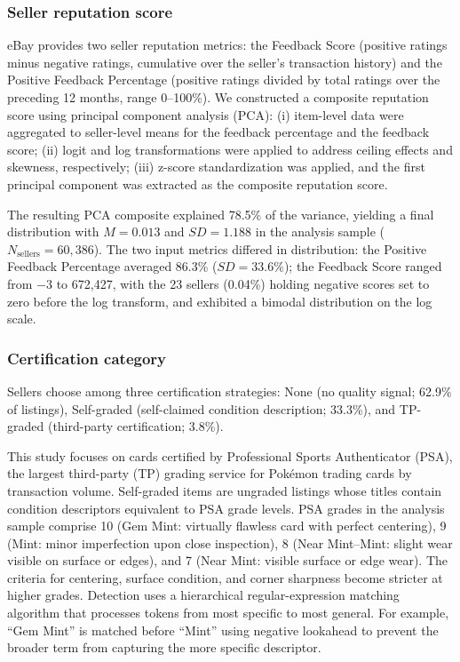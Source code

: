 \documentclass[11pt,letterpaper]{article}
\theoremstyle{definition}
\begin{document}
\subsubsection{Seller reputation score}

eBay provides two seller reputation metrics: the Feedback Score (positive ratings minus negative ratings, cumulative over the seller's transaction history) and the Positive Feedback Percentage (positive ratings divided by total ratings over the preceding 12 months, range 0--100\%). We constructed a composite reputation score using principal component analysis (PCA): (i) item-level data were aggregated to seller-level means for the feedback percentage and the feedback score; (ii) logit and log transformations were applied to address ceiling effects and skewness, respectively; (iii) z-score standardization was applied, and the first principal component was extracted as the composite reputation score.

The resulting PCA composite explained 78.5\% of the variance, yielding a final distribution with $M = 0.013$ and $SD = 1.188$ in the analysis sample ($N_{\text{sellers}} = 60{,}386$). The two input metrics differed in distribution: the Positive Feedback Percentage averaged 86.3\% ($SD = 33.6\%$); the Feedback Score ranged from $-3$ to 672,427, with the 23 sellers (0.04\%) holding negative scores set to zero before the log transform, and exhibited a bimodal distribution on the log scale.

\subsubsection{Certification category}

Sellers choose among three certification strategies: None (no quality signal; 62.9\% of listings), Self-graded (self-claimed condition description; 33.3\%), and TP-graded (third-party certification; 3.8\%).

This study focuses on cards certified by Professional Sports Authenticator (PSA), the largest third-party (TP) grading service for Pokémon trading cards by transaction volume. Self-graded items are ungraded listings whose titles contain condition descriptors equivalent to PSA grade levels. PSA grades in the analysis sample comprise 10 (Gem Mint: virtually flawless card with perfect centering), 9 (Mint: minor imperfection upon close inspection), 8 (Near Mint--Mint: slight wear visible on surface or edges), and 7 (Near Mint: visible surface or edge wear). The criteria for centering, surface condition, and corner sharpness become stricter at higher grades. Detection uses a hierarchical regular-expression matching algorithm that processes tokens from most specific to most general. For example, ``Gem Mint'' is matched before ``Mint'' using negative lookahead to prevent the broader term from capturing the more specific descriptor.
\end{document}
